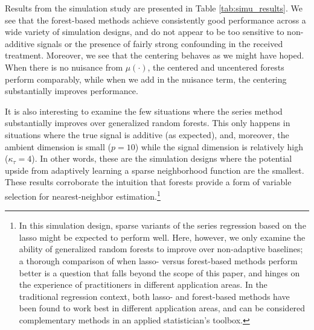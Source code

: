 \documentclass[aos]{imsart}
\theoremstyle{plain}
\theoremstyle{definition}
\theoremstyle{remark}
\begin{document}
\begin{CJK}{UTF8}{gbsn}
{\begin{appendix}
\begin{table}[p]
\centering

\caption{Results from simulation study described in Appendix \ref{sec:bigsimu}, in terms of
mean-squared error for the treatment effect on a test set, i.e., $\mathbb{E}[(\htau(X) - \tau(X))^2]$,
where $X$ is a test example. The methods under
comparison are centered generalized random forests (C.~GRF), plain generalized random forests (GRF), series instrumental
variables regression, and the nearest neighbors method (kNN). The simulation specification varies by whether or not
the function $\mu(\cdot)$ in \eqref{eq:simu_design} is 0, whether all signals are additive (add.),
whether the received treatment $W$ is confounded (conf.), the signal dimension ($\kappa_\tau$),
the ambient dimension ($p$), and the sample size ($n$). All errors are aggregated over 100
runs of the simulation with 1,000 test points each, and all forests have $B = 2,000$ trees.}
\label{tab:simu_results}
\restoregeometry
\end{table}



Results from the simulation study are presented in Table \ref{tab:simu_results}.
We see that the forest-based methods achieve consistently good performance across a
wide variety of simulation designs, and do not appear to be too sensitive to non-additive signals
or the presence of fairly strong confounding in the received treatment. Moreover, we see that
the centering behaves as we might have hoped. When there is no nuisance from $\mu(\cdot)$,
the centered and uncentered forests perform comparably, while when we add in the nuisance
term, the centering substantially improves performance.

It is also interesting to examine the few situations where the series method
substantially improves over generalized random forests. This only happens in situations
where the true signal is additive (as expected),
and, moreover, the ambient dimension is small ($p = 10$) while the signal dimension is
relatively high ($\kappa_\tau = 4$). In other words, these are the simulation designs where the
potential upside from adaptively learning a sparse neighborhood function are the smallest.
These results corroborate the intuition that forests provide a form of variable selection for nearest-neighbor
estimation.\footnote{In this simulation design, sparse variants of the series regression based on the lasso
might be expected to perform well. Here, however, we only examine
the ability of generalized random forests to improve over non-adaptive baselines; a thorough comparison of when lasso- versus
forest-based methods perform better is a question that falls beyond the scope of this paper, and
hinges on the experience of practitioners in different application areas. In the traditional regression context,
both lasso- and forest-based methods have been found to work best in different application areas, and
can be considered complementary methods in an applied statistician's toolbox.}


\end{appendix}}
\end{CJK}
\end{document}
